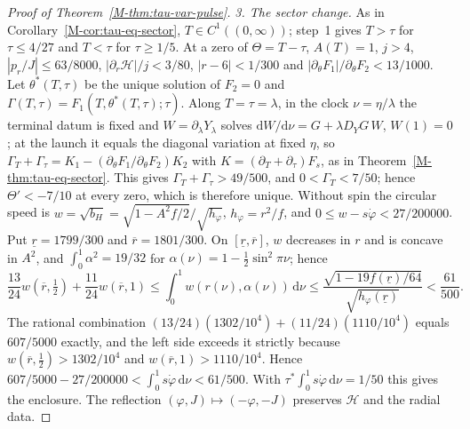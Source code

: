 \documentclass[aip,jmp,amsmath,amssymb,reprint]{revtex4-2}
\newcommand{\dd}{\mathrm{d}}
\theoremstyle{plain}
\theoremstyle{definition}
\begin{document}
\begin{proof}[Proof of Theorem~\ref{M-thm:tau-var-pulse}]
\emph{3. The sector change.} As in Corollary~\ref{M-cor:tau-eq-sector}, $T\in C^1((0,\infty))$; step~1 gives
$T>\tau$ for $\tau\le4/27$ and $T<\tau$ for $\tau\ge1/5$. At a zero of $\Theta=T-\tau$, $A(T)=1$, $j>4$,
$|p_r/J|\le63/8000$, $|\partial_r\mathcal H|/j<3/80$, $|r-6|<1/300$ and
$|\partial_\theta F_1|/\partial_\theta F_2<13/1000$. Let $\theta^*(T,\tau)$ be the unique solution of $F_2=0$ and
$\Gamma(T,\tau)=F_1(T,\theta^*(T,\tau);\tau)$. Along $T=\tau=\lambda$, in the clock $\nu=\eta/\lambda$ the terminal
datum is fixed and $W=\partial_\lambda Y_\lambda$ solves $\dd W/\dd \nu=G+\lambda D_YG\,W$, $W(1)=0$; at the launch it
equals the diagonal variation at fixed $\eta$, so $\Gamma_T+\Gamma_\tau=K_1-(\partial_\theta F_1/\partial_\theta F_2)K_2$
with $K=(\partial_T+\partial_\tau)F_s$, as in Theorem~\ref{M-thm:tau-eq-sector}. This gives
$\Gamma_T+\Gamma_\tau>49/500$, and $0<\Gamma_T<7/50$; hence
$\Theta'<-7/10$ at every zero, which is therefore unique. Without spin the circular speed is
$w=\sqrt{b_H}=\sqrt{1-A^2f/2}/\sqrt{h_\varphi}$, $h_\varphi=r^2/f$, and $0\le w-s\dot\varphi<27/200000$. Put
$\underline r=1799/300$ and $\overline r=1801/300$. On $[\underline r,\overline r]$, $w$ decreases in $r$ and is concave
in $A^2$, and $\int_0^1\alpha^2=19/32$ for $\alpha(\nu)=1-\frac12\sin^2\pi \nu$; hence
\[
 \frac{13}{24}w(\overline r,\tfrac12)+\frac{11}{24}w(\overline r,1)\le\int_0^1w(r(\nu),\alpha(\nu))\,\dd \nu
 \le\frac{\sqrt{1-19f(\underline r)/64}}{\sqrt{h_\varphi(\underline r)}}<\frac{61}{500}.
\]
The rational combination $(13/24)(1302/10^4)+(11/24)(1110/10^4)$ equals $607/5000$ exactly, and the left
side exceeds it strictly because $w(\overline r,\frac12)>1302/10^4$ and $w(\overline r,1)>1110/10^4$. Hence
$607/5000-27/200000<\int_0^1s\dot\varphi\,\dd \nu<61/500$. With $\tau^*\int_0^1s\dot\varphi\,\dd \nu=1/50$ this gives the enclosure. The reflection
$(\varphi,J)\mapsto(-\varphi,-J)$ preserves $\mathcal H$ and the radial data.
\end{proof}
\end{document}
